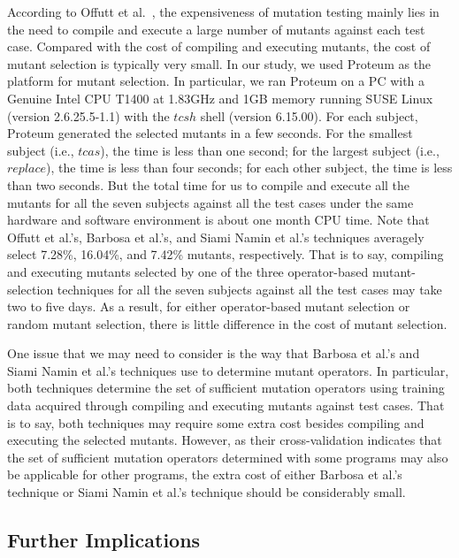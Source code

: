 According to Offutt et al.~\cite{Offutt:96}, the expensiveness of
mutation testing mainly lies in the need to compile and execute a
large number of mutants against each test case. Compared with the
cost of compiling and executing mutants, the cost of mutant
selection is typically very small. In our study, we used Proteum
as the platform for mutant selection. In particular, we ran
Proteum on a PC with a Genuine Intel CPU T1400 at 1.83GHz and 1GB
memory running SUSE Linux (version 2.6.25.5-1.1) with the $tcsh$
shell (version 6.15.00). For each subject, Proteum generated the
selected mutants in a few seconds. For the smallest subject (i.e.,
$tcas$), the time is less than one second; for the largest subject
(i.e., $replace$), the time is less than four seconds; for each
other subject, the time is less than two seconds. But the total
time for us to compile and execute all the mutants for all the
seven subjects against all the test cases under the same hardware
and software environment is about one month CPU time. Note that
Offutt et al.'s, Barbosa et al.'s, and Siami Namin et al.'s
techniques averagely select 7.28\%, 16.04\%, and 7.42\% mutants,
respectively. That is to say, compiling and executing mutants
selected by one of the three operator-based mutant-selection
techniques for all the seven subjects against all the test cases
may take two to five days. As a result, for either operator-based
mutant selection or random mutant selection, there is little
difference in the cost of mutant selection.

One issue that we may need to consider is the way that Barbosa et al.'s
and Siami Namin et al.'s techniques use to determine mutant
operators. In particular, both techniques determine the set of
sufficient mutation operators using training data acquired through
compiling and executing mutants against test cases. That is to
say, both techniques may require some extra cost besides compiling
and executing the selected mutants. However, as their
cross-validation indicates that the set of sufficient mutation
operators determined with some programs may also be applicable for
other programs, the extra cost of either Barbosa et al.'s
technique or Siami Namin et al.'s technique should be considerably
small.

\vspace{-1.5ex}
\subsection{Further Implications}
\label{Implications}


